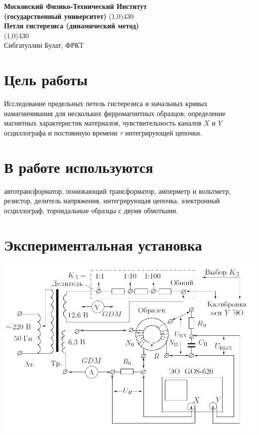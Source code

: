 \documentclass[a4paper, 12pt]{article}%
\begin{document}
\begin{titlepage}

\begin{center}
\large\textbf{Московский Физико-Технический Институт}\\
\large\textbf{(государственный университет)}
\vfill
\line(1,0){430}\\[1mm]
\huge\textbf{Петля гистерезиса (динамический метод)}\\
\line(1,0){430}\\[1mm]
\vfill
\large Сибгатуллин Булат, ФРКТ\\
\end{center}

\end{titlepage}

\section*{Цель работы}
Исследование предельных петель гистерезиса и начальных кривых намагничивания для нескольких ферромагнитных образцов; определение магнитных характеристик материалов, чувствительность каналов $X$ и $Y$ осциллографа и постоянную времени $\tau$ интегрирующей цепочки.
\section*{В работе используются}
автотрансформатор, понижающий трансформатор, амперметр и вольтметр, резистор, делитель напряжения, интегрирующая цепочка, электронный осциллограф, тороидальные образцы с двумя обмотками.
\section*{Экспериментальная установка}
\includegraphics[width = \textwidth]{1.png}
\end{document}
